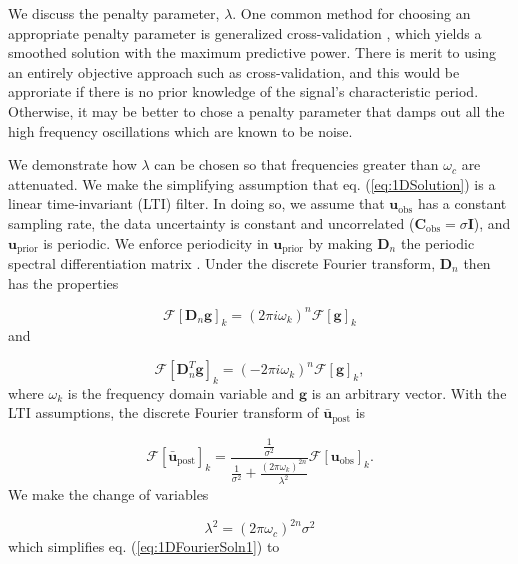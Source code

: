 \documentclass[10pt,a4paper]{article}
\begin{document}
We discuss the penalty parameter, $\lambda$. One common method for choosing an appropriate penalty parameter is generalized cross-validation \citep{Craven1979}, which yields a smoothed solution with the maximum predictive power. There is merit to using an entirely objective approach such as cross-validation, and this would be approriate if there is no prior knowledge of the signal's characteristic period. Otherwise, it may be better to chose a penalty parameter that damps out all the high frequency oscillations which are known to be noise. 

We demonstrate how $\lambda$ can be chosen so that frequencies greater than $\omega_c$ are attenuated.  We make the simplifying assumption that eq. (\ref{eq:1DSolution}) is a linear time-invariant (LTI) filter.  In doing so, we assume that $\mathbf{u}_\mathrm{obs}$ has a constant sampling rate, the data uncertainty is constant and uncorrelated ($\mathbf{C}_\mathrm{obs} = \sigma \mathbf{I}$), and $\mathbf{u}_\mathrm{prior}$ is periodic. We enforce periodicity in $\mathbf{u}_\mathrm{prior}$ by making $\mathbf{D}_n$ the periodic spectral differentiation matrix \citep[e.g.][]{Trefethen2000}. Under the discrete Fourier transform, $\mathbf{D}_n$ then has the properties 

\begin{equation}\label{eq:Property1}
  \mathcal{F}\left[\mathbf{D}_n \mathbf{g}\right]_k = (2\pi i\omega_k)^n \mathcal{F}\left[\mathbf{g}\right]_k
\end{equation}
and

\begin{equation}\label{eq:Property2}
  \mathcal{F}\left[\mathbf{D}^T_n \mathbf{g}\right]_k = (-2\pi i\omega_k)^n \mathcal{F}\left[\mathbf{g}\right]_k,
\end{equation}
where $\omega_k$ is the frequency domain variable and $\mathbf{g}$ is an arbitrary vector. With the LTI assumptions, the discrete Fourier transform of $\mathbf{\bar{u}}_\mathrm{post}$ is 

\begin{equation}\label{eq:1DFourierSoln1}
\mathcal{F}\left[\mathbf{\bar{u}}_\mathrm{post}\right]_k = \frac{\frac{1}{\sigma^2}}
                               {\frac{1}{\sigma^2} +                  
                                \frac{(2\pi\omega_k)^{2n}}{\lambda^2}}
                                \mathcal{F}\left[\mathbf{u}_\mathrm{obs}\right]_k.
\end{equation}
We make the change of variables 

\begin{equation}\label{eq:VariableChange}
\lambda^2 = (2\pi\omega_c)^{2n}\sigma^2
\end{equation}
which simplifies eq. (\ref{eq:1DFourierSoln1}) to
\end{document}
